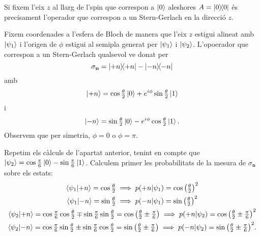 \documentclass[12pt]{article}
\numberwithin{table}{section}
\numberwithin{figure}{section}
\numberwithin{equation}{section}
\renewcommand{\vec}[1]{\mathbf{#1}}
\newcommand{\proj}[1]{\ketbra{#1}{#1}}
\begin{document}
\section{}
Si fixem l'eix \( z \) al llarg de l'spin que correspon a \( \ket{0} \) aleshores \( A = \proj{0} \) és precisament l'operador que correspon a un Stern-Gerlach en la direcció \( z \). 

Fixem coordenades a l'esfera de Bloch de manera que l'eix \( z \) estigui alineat amb \( \ket{\psi_1} \) i l'origen de \( \phi \) estigui al semipla generat per \( \ket{\psi_1} \) i \( \ket{\psi_2} \). L'opoerador que correspon a un Stern-Gerlach qualsevol ve donat per 
\begin{equation*}
	\sigma_{\vec{n}} = \proj{+n} - \proj{-n}
\end{equation*}
amb
\begin{equation*}
	\ket{+n} = \cos{\tfrac{\theta}{2}} \ket{0} + e^{i\phi}\sin{\tfrac{\theta}{2}} \ket{1}
\end{equation*}
i
\begin{equation*}
	\ket{-n} = \sin{\tfrac{\theta}{2}} \ket{0} - e^{i\phi}\cos{\tfrac{\theta}{2}} \ket{1}.
\end{equation*}
Observem que per simetria, \( \phi = 0 \) o \( \phi = \pi \). 

Repetim els càlculs de l'apartat anterior, tenint en compte que \( \ket{\psi_2} = \cos{\tfrac{\pi}{6}} \ket{0} - \sin{\tfrac{\pi}{6}}\ket{1} \). Calculem primer les probabilitats de la mesura de \( \sigma_\vec{n} \) sobre els estats:
\begin{gather*}
	\braket{\psi_1}{+n} = \cos{\tfrac{\theta}{2}} \implies p(+n \vert \psi_1) = \cos{\left(\tfrac{\theta}{2}\right)}^2 \\
	\braket{\psi_1}{-n} = \sin{\tfrac{\theta}{2}} \implies p(-n \vert \psi_1) = \sin{\left(\tfrac{\theta}{2}\right)}^2 \\
	\braket{\psi_2}{+n} = \cos{\tfrac{\pi}{6}} \cos{\tfrac{\theta}{2}} \mp \sin{\tfrac{\pi}{6}}\sin{\tfrac{\theta}{2}} = \cos{\left(\tfrac{\theta}{2} \pm \tfrac{\pi}{6}\right)} \implies p(+n \vert \psi_2) = \cos{\left(\tfrac{\theta}{2} \pm \tfrac{\pi}{6}\right)}^2 \\
	\braket{\psi_2}{-n} = \cos{\tfrac{\pi}{6}} \sin{\tfrac{\theta}{2}} \pm \sin{\tfrac{\pi}{6}}\cos{\tfrac{\theta}{2}} = \sin{\left(\tfrac{\theta}{2} \pm \tfrac{\pi}{6}\right)} \implies p(-n \vert \psi_2) = \sin{\left(\tfrac{\theta}{2} \pm \tfrac{\pi}{6}\right)}^2. 
\end{gather*}
\end{document}

